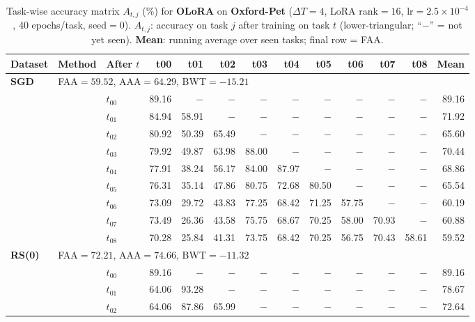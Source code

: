 \begin{table}[ht]
\centering
\caption{%
  Task-wise accuracy matrix $A_{t,j}$ (\%) for \textbf{OLoRA} on \textbf{Oxford-Pet} ($\Delta T=4$, LoRA rank$=16$, lr$=2.5\times10^{-4}$, 40 epochs/task, seed$=0$).
  $A_{t,j}$: accuracy on task $j$ after training on task $t$  (lower-triangular; ``$-$'' = not yet seen).
  \textbf{Mean}: running average over seen tasks; final row = FAA.
}
\label{tab:raw_olora_pets}
\setlength{\tabcolsep}{2.8pt}
\renewcommand{\arraystretch}{0.88}
\scriptsize
\begin{tabular}{@{}l l l *{10}{r}@{}}
\toprule
\textbf{Dataset} & \textbf{Method} & \textbf{After $t$} & \textbf{t00} & \textbf{t01} & \textbf{t02} & \textbf{t03} & \textbf{t04} & \textbf{t05} & \textbf{t06} & \textbf{t07} & \textbf{t08} & \textbf{Mean} \\
\midrule
\multirow{10}{*}{\textbf{SGD}} & \multicolumn{11}{l}{\quad\small FAA$=59.52$,\; AAA$=64.29$,\; BWT$=-15.21$} \\
 & & $t_{00}$ & 89.16 & $-$ & $-$ & $-$ & $-$ & $-$ & $-$ & $-$ & $-$ & 89.16 \\
 & & $t_{01}$ & 84.94 & 58.91 & $-$ & $-$ & $-$ & $-$ & $-$ & $-$ & $-$ & 71.92 \\
 & & $t_{02}$ & 80.92 & 50.39 & 65.49 & $-$ & $-$ & $-$ & $-$ & $-$ & $-$ & 65.60 \\
 & & $t_{03}$ & 79.92 & 49.87 & 63.98 & 88.00 & $-$ & $-$ & $-$ & $-$ & $-$ & 70.44 \\
 & & $t_{04}$ & 77.91 & 38.24 & 56.17 & 84.00 & 87.97 & $-$ & $-$ & $-$ & $-$ & 68.86 \\
 & & $t_{05}$ & 76.31 & 35.14 & 47.86 & 80.75 & 72.68 & 80.50 & $-$ & $-$ & $-$ & 65.54 \\
 & & $t_{06}$ & 73.09 & 29.72 & 43.83 & 77.25 & 68.42 & 71.25 & 57.75 & $-$ & $-$ & 60.19 \\
 & & $t_{07}$ & 73.49 & 26.36 & 43.58 & 75.75 & 68.67 & 70.25 & 58.00 & 70.93 & $-$ & 60.88 \\
 & & $t_{08}$ & 70.28 & 25.84 & 41.31 & 73.75 & 68.42 & 70.25 & 56.75 & 70.43 & 58.61 & 59.52 \\
\midrule
\multirow{10}{*}{\textbf{RS(0)}} & \multicolumn{11}{l}{\quad\small FAA$=72.21$,\; AAA$=74.66$,\; BWT$=-11.32$} \\
 & & $t_{00}$ & 89.16 & $-$ & $-$ & $-$ & $-$ & $-$ & $-$ & $-$ & $-$ & 89.16 \\
 & & $t_{01}$ & 64.06 & 93.28 & $-$ & $-$ & $-$ & $-$ & $-$ & $-$ & $-$ & 78.67 \\
 & & $t_{02}$ & 64.06 & 87.86 & 65.99 & $-$ & $-$ & $-$ & $-$ & $-$ & $-$ & 72.64 \\

\end{tabular}
\end{table}
